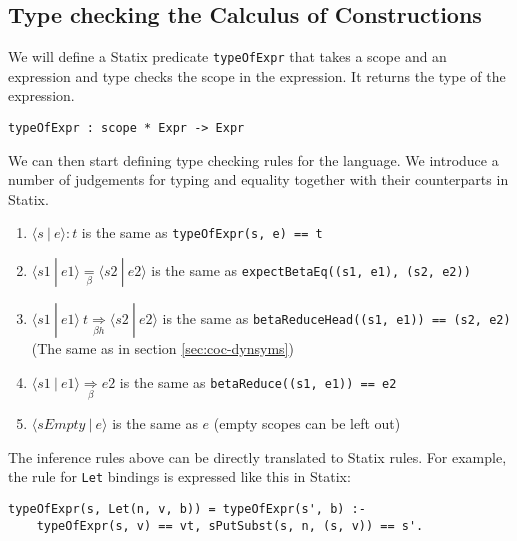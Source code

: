 \documentclass[a4paper,UKenglish,cleveref, autoref, thm-restate]{oasics-v2021}
\newcommand{\scope}[2]{\langle#1 \: | \: #2\rangle}
\newcommand{\bhr}[3]{ #1 \: #2 \underset{\beta h}{\Rightarrow} #3 }
\newcommand{\toe}[3]{ \scope{#1}{#2} : #3 }
\newcommand{\bred}[3]{ \scope{#1}{#2} \underset{\beta}{\Rightarrow} #3 }
\newcommand{\beq}[2]{ #1 \underset{\beta}{=} #2 }
\begin{document}
\subsection{Type checking the Calculus of Constructions}
\label{sec:coc-typecheck}

We will define a Statix predicate \verb|typeOfExpr| that takes a scope and an expression and type checks the scope in the expression. It returns the type of the expression.

\begin{lstlisting}
typeOfExpr : scope * Expr -> Expr
\end{lstlisting}
We can then start defining type checking rules for the language. We introduce a number of judgements for typing and equality together with their counterparts in Statix.
\begin{enumerate}
	\item $\toe{s}{e}{t}$ is the same as \verb|typeOfExpr(s, e) == t|
	\item $\beq{\scope{s1}{e1}}{\scope{s2}{e2}}$ is the same as \verb|expectBetaEq((s1, e1), (s2, e2))|
	\item $\bhr{\scope{s1}{e1}}{t}{\scope{s2}{e2}}$ is the same as \verb|betaReduceHead((s1, e1)) == (s2, e2)| \\ (The same as in section \ref{sec:coc-dynsyms})
	\item $\bred{s1}{e1}{e2}$ is the same as \verb|betaReduce((s1, e1)) == e2|
	\item $\scope{sEmpty}{e}$ is the same as $e$ (empty scopes can be left out)
\end{enumerate}

The inference rules above can be directly translated to Statix rules. For example, the rule for \verb|Let| bindings is expressed like this in Statix:
\begin{lstlisting}
typeOfExpr(s, Let(n, v, b)) = typeOfExpr(s', b) :-
    typeOfExpr(s, v) == vt, sPutSubst(s, n, (s, v)) == s'.
\end{lstlisting}
\end{document}
